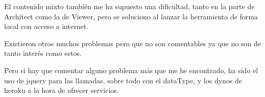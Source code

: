 El contenido mixto también me ha supuesto una dificultad, tanto en la parte de Architect como la de Viewer, pero se soluciono al lanzar la herramienta de forma local con acceso a internet. 

Existieron otros muchos problemas pero que no son comentables ya que no son de tanto interés como estos.

Pero si hay que comentar alguno problema más que me he encontrado, ha sido el uso de jquery para las llamadas, sobre todo con el dataType, y los dynos de heroku a la hora de ofrecer servicios.